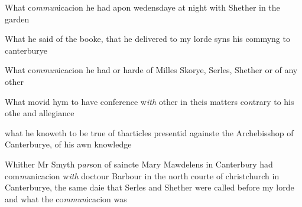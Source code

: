 \documentclass[12pt, a4paper]{book}
\begin{document}
            		
				\marginpar[\vspace{0.5cm}{\textcolor{Gray}{6}}]{}
			
		\ifthenelse{\isodd{\thepage}}
		{\reversemarginpar}
		{\normalmarginpar}
		What co\textit{mmun}icacion he had apon wedensdaye at night with Shether in the garden

            		
				\marginpar[\vspace{0.5cm}{\textcolor{Gray}{7}}]{}
			
		\ifthenelse{\isodd{\thepage}}
		{\reversemarginpar}
		{\normalmarginpar}
		What he said of the booke, that he delivered to my lorde syns his commyng to canterburye

            		
				\marginpar[\vspace{0.5cm}{\textcolor{Gray}{8}}]{}
			
		\ifthenelse{\isodd{\thepage}}
		{\reversemarginpar}
		{\normalmarginpar}
		What co\textit{mmun}icacion he had or harde of Milles Skorye, Serles, Shether
or of any other

            		
				\marginpar[\vspace{0.5cm}{\textcolor{Gray}{9}}]{}
			 
		\ifthenelse{\isodd{\thepage}}
		{\reversemarginpar}
		{\normalmarginpar}
		What movid hym to have conference w\textit{ith} other in theis matters co\textit{n}trary
to his othe and allegiance

            		
				\marginpar[\vspace{0.5cm}{\textcolor{Gray}{10}}]{}
			
		\ifthenelse{\isodd{\thepage}}
		{\reversemarginpar}
		{\normalmarginpar}
		what he knoweth to be true of tharticles presentid againste the 
Archebisshop of Canterburye, of his awn knowledge

            		
				\marginpar[\vspace{0.5cm}{\textcolor{Gray}{11}}]{}
			 
		\ifthenelse{\isodd{\thepage}}
		{\reversemarginpar}
		{\normalmarginpar}
		Whither Mr Smyth p\textit{ar}son of saincte Mary Mawdelens in Canterb\textit{u}ry
had com\textit{mu}nicacion w\textit{ith} doctour Barbour in the north courte of christchurch
in Canterburye, the same daie that Serles and Shether were called 
before my lorde and what the
			 co\textit{mmun}icacion was

            		
				\marginpar[\vspace{0.5cm}{\textcolor{Gray}{12}}]{}
			
\end{document}
